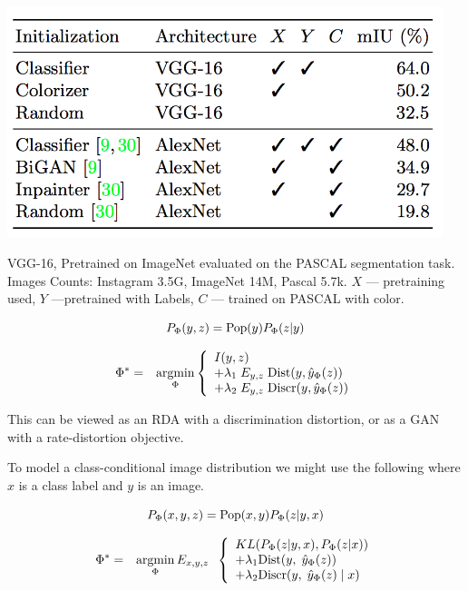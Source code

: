 {

\centerline{\includegraphics[width = 5in]{../images/LearnRepColorc}}
VGG-16, Pretrained on ImageNet evaluated on the PASCAL segmentation task.
Images Counts: {\color{red} Instagram 3.5G, ImageNet 14M, Pascal 5.7k}.
$X$ --- pretraining used, $Y$ ---pretrained with Labels, $C$ --- trained on PASCAL with color.


{\color{red} $$P_\Phi(y,z) = \mathrm{Pop}(y)P_\Phi(z|y)$$}

\begin{eqnarray*}
\Phi^* & =  & \operatorname*{argmin}_\Phi \left\{\begin{array}{l} I(y,z) \\
+ \lambda_1\;E_{y,z}\;\mathrm{Dist}(y,\hat{y}_\Phi(z)) \\
+ \lambda_2 \;E_{y,z}\;\mathrm{Discr}(y,\hat{y}_\Phi(z))\end{array}\right.
\end{eqnarray*}

\vfill
This can be viewed as an RDA with a discrimination distortion, or as a GAN with a rate-distortion objective.



\vfill
To model a class-conditional image distribution we might use the following where $x$ is a class label and $y$ is an image.

{\color{red} $$P_\Phi(x,y,z) = \mathrm{Pop}(x,y)P_\Phi(z|y,x)$$}

\begin{eqnarray*}
\Phi^* & =  & \operatorname*{argmin}_\Phi E_{x,y,z}\;\;\left\{\begin{array}{l} KL(P_\Phi(z|y,x),P_\Phi(z|x)) \\
+ \lambda_1\mathrm{Dist}(y,\;\hat{y}_\Phi(z)) \\
+ \lambda_2 \mathrm{Discr}(y,\;\hat{y}_\Phi(z)\;|\;x)\end{array}\right.
\end{eqnarray*}


}
